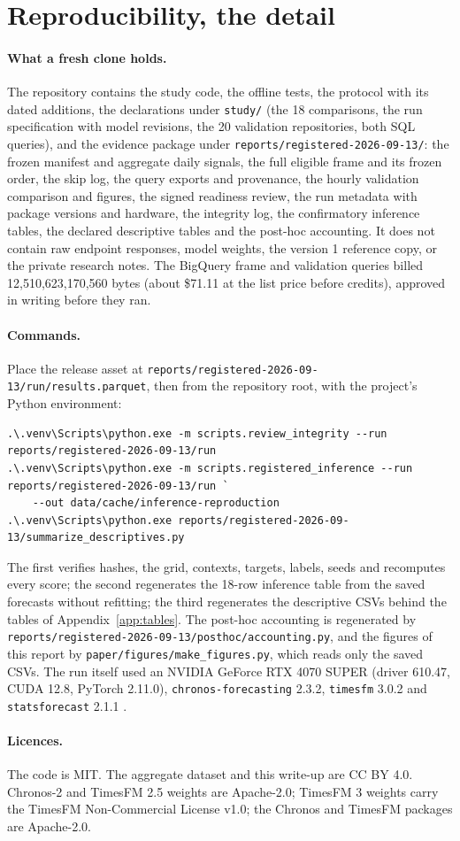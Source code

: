 \section{Reproducibility, the detail}
\label{app:repro}

\paragraph{What a fresh clone holds.} The repository contains the study code, the offline tests, the
protocol with its dated additions, the declarations under \texttt{study/} (the 18 comparisons, the run
specification with model revisions, the 20 validation repositories, both SQL queries), and the evidence
package under \texttt{reports/registered-2026-09-13/}: the frozen manifest and aggregate daily signals, the
full eligible frame and its frozen order, the skip log, the query exports and provenance, the hourly
validation comparison and figures, the signed readiness review, the run metadata with package versions and
hardware, the integrity log, the confirmatory inference tables, the declared descriptive tables and the
post-hoc accounting. It does not contain raw endpoint responses, model weights, the version 1 reference copy,
or the private research notes. The BigQuery frame and validation queries billed 12,510,623,170,560 bytes
(about \$71.11 at the list price before credits), approved in writing before they ran.

\paragraph{Commands.} Place the release asset at
\texttt{reports/registered-2026-09-13/run/results.parquet}, then from the repository root, with the
project's Python environment:
{\footnotesize
\begin{verbatim}
.\.venv\Scripts\python.exe -m scripts.review_integrity --run reports/registered-2026-09-13/run
.\.venv\Scripts\python.exe -m scripts.registered_inference --run reports/registered-2026-09-13/run `
    --out data/cache/inference-reproduction
.\.venv\Scripts\python.exe reports/registered-2026-09-13/summarize_descriptives.py
\end{verbatim}}
The first verifies hashes, the grid, contexts, targets, labels, seeds and recomputes every score; the second
regenerates the 18-row inference table from the saved forecasts without refitting; the third regenerates the
descriptive CSVs behind the tables of Appendix~\ref{app:tables}. The post-hoc accounting is regenerated by
\texttt{reports/registered-2026-09-13/posthoc/accounting.py}, and the figures of this report by
\texttt{paper/figures/make\_figures.py}, which reads only the saved CSVs. The run itself used an NVIDIA
GeForce RTX 4070 SUPER (driver 610.47, CUDA 12.8, PyTorch 2.11.0), \texttt{chronos-forecasting} 2.3.2,
\texttt{timesfm} 3.0.2 and \texttt{statsforecast} 2.1.1 \citep{timesfm-pypi, statsforecast-2.1.1}.

\paragraph{Licences.} The code is MIT. The aggregate dataset and this write-up are CC BY 4.0. Chronos-2 and
TimesFM 2.5 weights are Apache-2.0; TimesFM 3 weights carry the TimesFM Non-Commercial License v1.0; the
Chronos and TimesFM packages are Apache-2.0.
